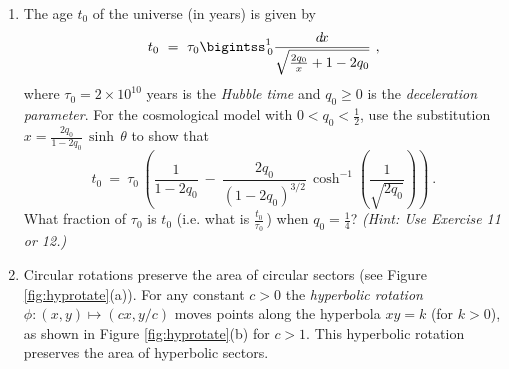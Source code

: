 {\begin{enumerate}[\bfseries 1.]
\[\]
 \begin{enumerate}[\bfseries (a)]
  \item Use the value of $n$ from Example \ref{exmp:paramag} to show that
   $\frac{M}{n\mu} ~=~ L(a)$, where $L(a) = \coth\,a - \frac{1}{a}$ is the
   \emph{Langevin function}
   and $a=\frac{\mu H}{kT}$.
  \item Show that for $a=\frac{\mu H}{kT}$, $\mu_{\text{max}} > 0$, and
  $x = \frac{\mu_{\text{max}} H}{kT}$,
\[
\int_0^{\mu_{\text{max}}} L(a)~d\!\mu ~=~ \frac{1}{x}\,\ln\,\left(\frac{\sinh\,x}{x}\right) ~.
\]
 \end{enumerate}
 \item The age $t_0$ of the universe (in years) is given by
\[
t_0 ~=~ \tau_0 \bigintss_{\,0}^1 \frac{\dx}{\sqrt{\frac{2q_0}{x} + 1 - 2q_0}} ~,
\]
where $\tau_0 = 2 \times 10^{10}$ years is the \emph{Hubble time} and
$q_0 \ge 0$ is the \emph{deceleration parameter}. For the cosmological model
with $0 < q_0 < \frac{1}{2}$, use the substitution
$x = \frac{2q_0}{1-2q_0}\,\sinh\,\theta$ to show that
\[
t_0 ~=~ \tau_0\,\left(\frac{1}{1-2q_0} ~-~
\frac{2q_0}{(1-2q_0)^{3/2}}\,\cosh^{-1}\left(\frac{1}{\sqrt{2q_0}}\right)\right) ~.
\]
What fraction of $\tau_0$ is $t_0$ (i.e. what is $\frac{t_0}{\tau_0}\,$) when
$q_0=\frac{1}{4}$? \emph{(Hint: Use Exercise 11 or 12.)}
 \item Circular rotations preserve the area of circular sectors (see
  Figure \ref{fig:hyprotate}(a)). For any constant $c>0$ the\index{$\hypsector$}
  \emph{hyperbolic rotation} $\phi: (x,y) \mapsto (cx,y/c)$ moves points along
  the hyperbola $xy=k$ (for $k>0$), as shown in Figure \ref{fig:hyprotate}(b)
  for $c>1$. This hyperbolic rotation preserves the area of hyperbolic
  sectors.
\begin{figure}[h]
 \centering
\end{figure}
\end{enumerate}}
